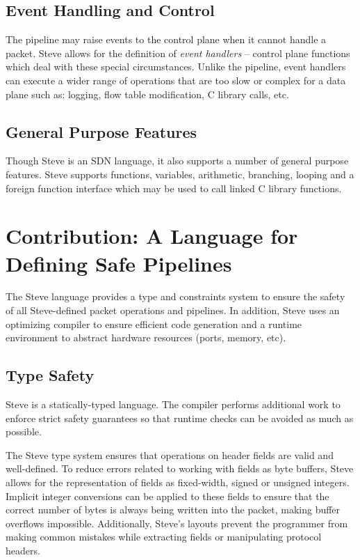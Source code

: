 \subsection{Event Handling and Control}

The pipeline may raise events to the control plane when
it cannot handle a packet. Steve allows for the definition of
\emph{event handlers} -- control plane functions which deal
with these special circumstances.
Unlike the pipeline, event handlers can execute a wider range of
operations that are too slow or complex for a data plane such as:
logging, flow table modification, C library calls, etc.

\subsection{General Purpose Features}

Though Steve is an SDN language, it also supports a number of general purpose
features. 
Steve supports functions, variables, arithmetic, branching, 
looping and a foreign function interface which may be used to call linked C 
library functions.

\section{Contribution: A Language for Defining Safe Pipelines}

The Steve language provides a type and constraints system to ensure the safety
of all Steve-defined packet operations and pipelines.
In addition, Steve uses an optimizing compiler to ensure efficient code
generation
and a runtime environment to abstract hardware resources (ports, memory, etc).

\subsection{Type Safety}

Steve is a statically-typed language. The compiler performs additional work to
enforce strict safety guarantees so that runtime checks can be avoided as much
as possible.

The Steve type system ensures that operations on header fields are valid and
well-defined. 
To reduce errors related to working with fields as byte buffers, Steve allows
for the representation of fields as fixed-width, signed or unsigned
integers.
Implicit integer conversions can be applied to these fields to ensure that the correct number of bytes is always being written into the packet, making buffer overflows impossible.
Additionally, Steve's layouts prevent the programmer from making common mistakes while extracting fields or manipulating protocol headers. 

